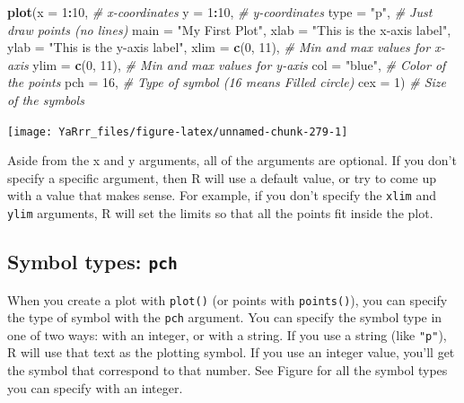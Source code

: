 \documentclass[]{book}
\newenvironment{Shaded}{\begin{snugshade}}{\end{snugshade}}
\newcommand{\KeywordTok}[1]{\textcolor[rgb]{0.13,0.29,0.53}{\textbf{#1}}}
\newcommand{\DataTypeTok}[1]{\textcolor[rgb]{0.13,0.29,0.53}{#1}}
\newcommand{\DecValTok}[1]{\textcolor[rgb]{0.00,0.00,0.81}{#1}}
\newcommand{\StringTok}[1]{\textcolor[rgb]{0.31,0.60,0.02}{#1}}
\newcommand{\CommentTok}[1]{\textcolor[rgb]{0.56,0.35,0.01}{\textit{#1}}}
\newcommand{\OperatorTok}[1]{\textcolor[rgb]{0.81,0.36,0.00}{\textbf{#1}}}
\newcommand{\NormalTok}[1]{#1}
\theoremstyle{definition}
\theoremstyle{definition}
\theoremstyle{remark}
\begin{document}
\begin{Shaded}
\begin{Highlighting}[]
\KeywordTok{plot}\NormalTok{(}\DataTypeTok{x =} \DecValTok{1}\OperatorTok{:}\DecValTok{10}\NormalTok{,                         }\CommentTok{# x-coordinates}
     \DataTypeTok{y =} \DecValTok{1}\OperatorTok{:}\DecValTok{10}\NormalTok{,                         }\CommentTok{# y-coordinates}
     \DataTypeTok{type =} \StringTok{"p"}\NormalTok{,                       }\CommentTok{# Just draw points (no lines)}
     \DataTypeTok{main =} \StringTok{"My First Plot"}\NormalTok{,}
     \DataTypeTok{xlab =} \StringTok{"This is the x-axis label"}\NormalTok{,}
     \DataTypeTok{ylab =} \StringTok{"This is the y-axis label"}\NormalTok{,}
     \DataTypeTok{xlim =} \KeywordTok{c}\NormalTok{(}\DecValTok{0}\NormalTok{, }\DecValTok{11}\NormalTok{),                  }\CommentTok{# Min and max values for x-axis}
     \DataTypeTok{ylim =} \KeywordTok{c}\NormalTok{(}\DecValTok{0}\NormalTok{, }\DecValTok{11}\NormalTok{),                  }\CommentTok{# Min and max values for y-axis}
     \DataTypeTok{col =} \StringTok{"blue"}\NormalTok{,                     }\CommentTok{# Color of the points}
     \DataTypeTok{pch =} \DecValTok{16}\NormalTok{,                         }\CommentTok{# Type of symbol (16 means Filled circle)}
     \DataTypeTok{cex =} \DecValTok{1}\NormalTok{)                           }\CommentTok{# Size of the symbols}
\end{Highlighting}
\end{Shaded}

\begin{center}\texttt{[image: YaRrr\_files/figure-latex/unnamed-chunk-279-1]} \end{center}

Aside from the x and y arguments, all of the arguments are optional. If
you don't specify a specific argument, then R will use a default value,
or try to come up with a value that makes sense. For example, if you
don't specify the \texttt{xlim} and \texttt{ylim} arguments, R will set
the limits so that all the points fit inside the plot.

\subsection{\texorpdfstring{Symbol types:
\texttt{pch}}{Symbol types: pch}}\label{symbol-types-pch}

When you create a plot with \texttt{plot()} (or points with
\texttt{points()}), you can specify the type of symbol with the
\texttt{pch} argument. You can specify the symbol type in one of two
ways: with an integer, or with a string. If you use a string (like
\texttt{"p"}), R will use that text as the plotting symbol. If you use
an integer value, you'll get the symbol that correspond to that number.
See Figure for all the symbol types you can specify with an integer.
\end{document}
